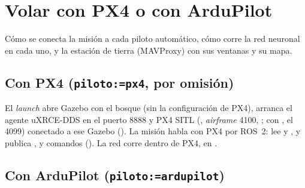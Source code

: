 \chapter{Volar con PX4 o con ArduPilot}
\label{cap:pilotos}

\begin{enpocas}
Cómo se conecta la misión a cada piloto automático, cómo corre la red neuronal en cada uno, y la estación
de tierra (MAVProxy) con sus ventanas y su mapa.
\end{enpocas}

\section{Con PX4 (\texorpdfstring{\texttt{piloto:=px4}}{piloto:=px4}, por omisión)}

El \emph{launch} abre Gazebo con el bosque (sin la configuración de PX4), arranca el agente uXRCE-DDS en
el puerto 8888 y PX4 SITL (, \emph{airframe} 4100, ; con , el 4099) conectado a ese Gazebo
(). La misión habla con PX4 por ROS~2: lee  y
, y publica ,
 y comandos (). La red corre dentro de
PX4, en .

\section{Con ArduPilot (\texorpdfstring{\texttt{piloto:=ardupilot}}{piloto:=ardupilot})}

